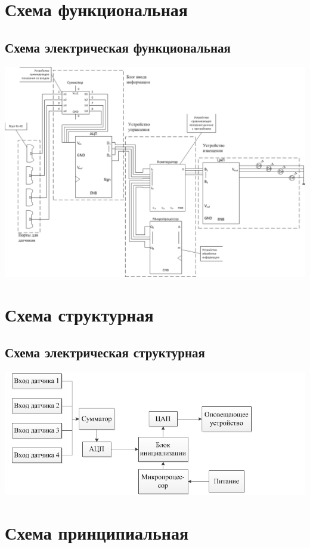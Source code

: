 \chapter{Схема функциональная}
	\section{Схема электрическая функциональная}
	\begin{center}
		\includegraphics[width=170mm]{src/pictures/schemep1.png}
	\end{center}
\chapter{Схема структурная}
	\section{Схема электрическая структурная}
	\begin{center}
		\includegraphics[width=170mm]{src/pictures/schemep2.png}
	\end{center}
\chapter{Схема принципиальная}
